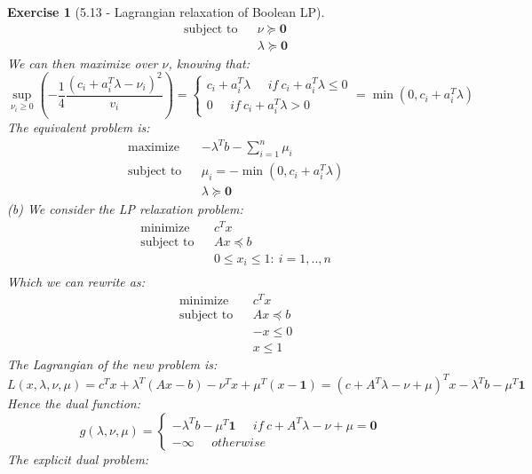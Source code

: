 \documentclass[11pt]{article}
\theoremstyle{exo}
\newtheorem*{exercise}{Exercise}
\newcommand{\1}{\mathbf{1}}
\newcommand{\0}{\mathbf{0}}
\begin{document}
\begin{exercise}[5.13 - Lagrangian relaxation of Boolean LP]
\begin{equation*}
\begin{aligned}
& \text{subject to} & & \nu\succeq \0\\
& & & \lambda\succeq \0
\end{aligned}
\end{equation*}
We can then maximize over $\nu$, knowing that:
\[\sup_{\nu_i\geq0}\left(-\frac{1}{4}\frac{(c_i+a_i^T\lambda-\nu_i)^2}{v_i}\right)=\begin{cases}c_i+a_i^T\lambda\phantom{abc}if\:c_i+a_i^T\lambda\leq0\\
0\phantom{abc}if\:c_i+a_i^T\lambda>0\end{cases}=\min(0,c_i+a_i^T\lambda)\]
The equivalent problem is:
\begin{equation}
\label{DREP}
\begin{aligned}
& {\text{maximize}} & &-\lambda^Tb-\sum_{i=1}^n\mu_i\\
& \text{subject to} & & \mu_i=-\min(0,c_i+a_i^T\lambda)\\
& & & \lambda\succeq\0
\end{aligned}
\end{equation}
(b) We consider the LP relaxation problem:
\begin{equation}
\label{NBP}
\begin{aligned}
& {\text{minimize}} & &c^Tx\\
& \text{subject to} & & Ax\preceq b\\
& & &0\leq x_i\leq 1:\ i=1,..,n\\
\end{aligned}
\end{equation}
Which we can rewrite as:
\begin{equation*}
\begin{aligned}
& {\text{minimize}} & &c^Tx\\
& \text{subject to} & & Ax\preceq b\\
& & &-x\leq 0 \\
& & &x\leq 1 
\end{aligned}
\end{equation*}
The Lagrangian of the new problem is:
\[L(x,\lambda,\nu,\mu)=c^Tx+\lambda^T(Ax-b)-\nu^Tx+\mu^T(x-\1)=(c+A^T\lambda-\nu+\mu)^Tx-\lambda^Tb-\mu^T\1\]
Hence the dual function:
\[g(\lambda,\nu,\mu)=\begin{cases}-\lambda^Tb-\mu^T\1\phantom{abc} if\:c+A^T\lambda-\nu+\mu=\0\\-\infty\phantom{abc}otherwise\end{cases}\]
The explicit dual problem:
\begin{equation}
\label{DR}
\begin{aligned}

\end{aligned}
\end{equation}
\end{exercise}
\end{document}
